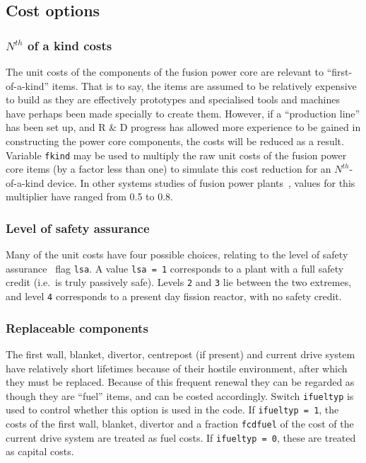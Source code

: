\documentclass[11pt,a4paper]{report}
\begin{document}
\subsection{Cost options}

\subsubsection{$N^{th}$ of a kind costs}

The unit costs of the components of the fusion power core are relevant to
``first-of-a-kind'' items. That is to say, the items are assumed to be
relatively expensive to build as they are effectively prototypes and
specialised tools and machines have perhaps been made specially to create
them. However, if a ``production line'' has been set up, and R \& D progress
has allowed more experience to be gained in constructing the power core
components, the costs will be reduced as a result. Variable \texttt{fkind} may
be used to multiply the raw unit costs of the fusion power core items (by a
factor less than one) to simulate this cost reduction for an
$N^{th}$-of-a-kind device. In other systems studies of fusion power
plants~\cite{galambos}, values for this multiplier have ranged from 0.5 to
0.8.

\subsubsection{Level of safety assurance}

Many of the unit costs have four possible choices, relating to the level of
safety assurance~\cite{lsa} flag \texttt{lsa}. A value \texttt{lsa = 1}
corresponds to a plant with a full safety credit (i.e.\ is truly passively
safe). Levels \texttt{2} and \texttt{3} lie between the two extremes, and
level \texttt{4} corresponds to a present day fission reactor, with no safety
credit.

\subsubsection{Replaceable components}

The first wall, blanket, divertor, centrepost (if present) and current drive
system have relatively short lifetimes because of their hostile environment,
after which they must be replaced. Because of this frequent renewal they can
be regarded as though they are ``fuel'' items, and can be costed
accordingly. Switch \texttt{ifueltyp} is used to control whether this option
is used in the code. If \texttt{ifueltyp = 1}, the costs of the first wall,
blanket, divertor and a fraction \texttt{fcdfuel} of the cost of the current
drive system are treated as fuel costs. If \texttt{ifueltyp = 0}, these are
treated as capital costs.
\end{document}
